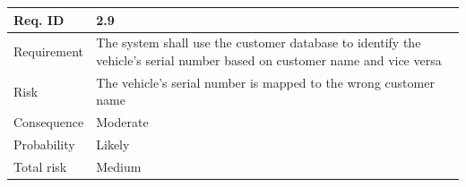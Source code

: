 
\begin{table}[H]
\centering
\begin{tabularx}{1.0\textwidth}{
    |p{}%
    |p{}|%
}
\hline

Req. ID
& 2.9
\\
\hline

Requirement
& The system shall use the customer database to identify the vehicle's serial number based on customer name and vice versa
\\
\hline

Risk
& 
The vehicle's serial number is mapped  to the wrong customer name
\\
\hline

Consequence
&
Moderate
\\
\hline

Probability
&
Likely

\\
\hline

Total risk
&
Medium 
\\
\hline

\end{tabularx}
\end{table}

